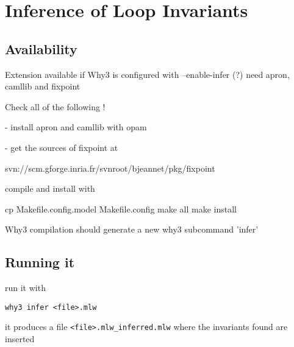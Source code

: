 
\chapter{Inference of Loop Invariants}

\section{Availability}

Extension available if Why3 is configured with --enable-infer (?) need apron, camllib and fixpoint

Check all of the following !

- install apron and camllib with opam

- get the sources of fixpoint at

svn://scm.gforge.inria.fr/svnroot/bjeannet/pkg/fixpoint

compile and install with

cp Makefile.config.model Makefile.config
make all
make install


Why3 compilation should generate a new why3 subcommand 'infer'

\section{Running it}


run it with
\begin{verbatim}
why3 infer <file>.mlw
\end{verbatim}

it produces a file \verb|<file>.mlw_inferred.mlw| where the invariants found are inserted
